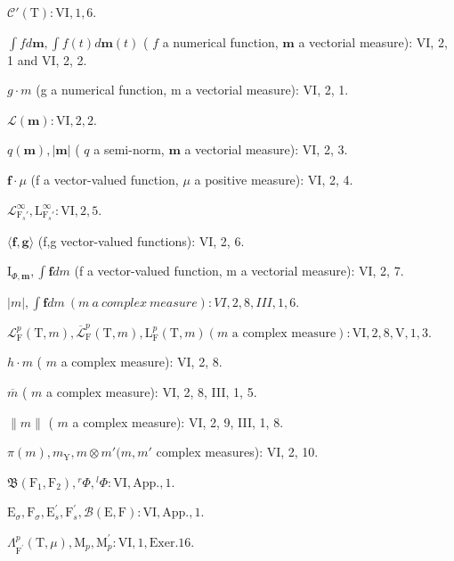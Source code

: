 \(\mathcal{C}'(\mathrm{T}) : \mathrm{VI}, 1, 6.\)

\(\int f d\mathbf{m}, \int f(t) d\mathbf{m}(t)\) ( \(f\) a numerical function, \(\mathbf{m}\) a vectorial measure): VI, 2, 1 and VI, 2, 2.

\(g \cdot m\) (g a numerical function, m a vectorial measure): VI, 2, 1.

\(\mathcal{L}(\mathbf{m}) : \mathrm{VI}, 2, 2.\)

\(q(\mathbf{m}), |\mathbf{m}|\) ( \(q\) a semi-norm, \(\mathbf{m}\) a vectorial measure): VI, 2, 3.

\(\mathbf{f} \cdot \mu\) (f a vector-valued function, \(\mu\) a positive measure): VI, 2, 4.

\(\mathcal{L}_{\mathrm{F}_s'}^{\infty}, \mathrm{L}_{\mathrm{F}_s'}^{\infty} : \mathrm{VI}, 2, 5.\)

\(\langle \mathbf{f},\mathbf{g}\rangle\) (f,g vector-valued functions): VI, 2, 6.

\(\mathrm{I}_{\Phi ,\mathbf{m}},\int \mathbf{f}dm\) (f a vector-valued function, m a vectorial measure): VI, 2, 7.

\(|m|, \int \mathbf{f} dm \ (m \ a \ complex \ measure) : VI, 2, 8, III, 1, 6.\)

\(\mathcal{L}_{\mathrm{F}}^{p}(\mathrm{T},m), \overline{\mathcal{L}}_{\mathrm{F}}^{p}(\mathrm{T},m), \mathrm{L}_{\mathrm{F}}^{p}(\mathrm{T},m) (m \text{ a complex measure}): \mathrm{VI}, 2, 8, \mathrm{V}, 1, 3.\)

\(h \cdot m\) ( \(m\) a complex measure): VI, 2, 8.

\(\overline{m}\) ( \(m\) a complex measure): VI, 2, 8, III, 1, 5.

\(\| m\|\) ( \(m\) a complex measure): VI, 2, 9, III, 1, 8.

\(\pi (m), m_{\mathrm{Y}}, m \otimes m' (m, m'\) complex measures): VI, 2, 10.

\(\mathfrak{B}(\mathrm{F}_{1},\mathrm{F}_{2}),{}^{r}\Phi,{}^{l}\Phi :\mathrm{VI},\mathrm{App.},1.\)

\(\mathrm{E}_{\sigma}, \mathrm{F}_{\sigma}, \mathrm{E}_{s}^{\prime}, \mathrm{F}_{s}^{\prime}, \mathcal{B}(\mathrm{E}, \mathrm{F}) : \mathrm{VI}, \mathrm{App.}, 1.\)

\(\Lambda_{\mathrm{F}^{\prime}}^{p}(\mathrm{T},\mu),\mathrm{M}_{p},\mathrm{M}_{p}^{\prime}:\mathrm{VI},1,\mathrm{Exer.}16.\)
